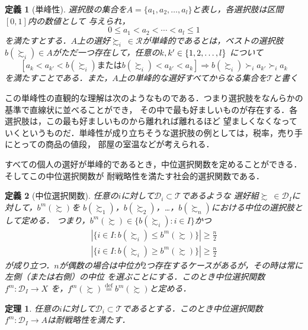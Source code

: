 \documentclass[dvipdfmx]{jsarticle}
\newtheorem*{THeorem}{定理}
\newtheorem*{DEfinition}{定義}
\begin{document}
\begin{DEfinition}[単峰性]
  選択肢の集合を$A = \{a_1, a_2, \ldots, a_{l}\}$と表し，各選択肢は区間$[0,1]$内の数値として
  与えられ，
  \[
    0 \leq a_1 < a_2 < \cdots < a_{l} \leq 1
  \]
  を満たすとする．$A$上の選好$\succsim_i \ \in \mathcal{R}$が単峰的であるとは，ベストの選択肢
  $b(\succsim_i) \in A$がただ一つ存在して，任意の$k, k' \in \{ 1, 2, \ldots, \mathnormal{l} \}$
  について
  \[
    [a_k < a_{k'} < b(\succsim_i) \text{または} b(\succsim_i) < a_{k'} < a_k]
    \Rightarrow b(\succsim_i) \succ_i a_{k'} \succ_i a_{k}
  \]
  を満たすことである．また，$A$上の単峰的な選好すべてからなる集合を$\mathcal{T}$と書く
\end{DEfinition}

この単峰性の直観的な理解は次のようなものである．つまり選択肢をなんらかの基準で直線状に並べることができ，
その中で最も好ましいものが存在する．各選択肢は，この最も好ましいものから離れれば離れるほど
望ましくなくなっていくというものだ．単峰性が成り立ちそうな選択肢の例としては，税率，売り手にとっての商品の値段，
部屋の室温などが考えられる．

すべての個人の選好が単峰的であるとき，中位選択関数を定めることができる．そしてこの中位選択関数が
耐戦略性を満たす社会的選択関数である．

\begin{DEfinition}[中位選択関数]
  任意の$i$に対して$\mathcal{D}_i \subset \mathcal{T}$であるような
  選好組$\succsim \ \in \mathcal{D}_I$に対して，$b^m(\succsim)$を
  $b(\succsim_1)$，$b(\succsim_2)$，\ldots，$b(\succsim_n)$における中位の選択肢として定める．
  つまり，$b^m(\succsim) \in \{ b(\succsim_i):i \in I \}$かつ
  \begin{eqnarray*}
    | \{i \in I: b(\succsim_i) \leq b^m(\succsim) \} | \geq \frac{n}{2} \\
    | \{i \in I: b(\succsim_i) \geq b^m(\succsim) \} | \geq \frac{n}{2}
  \end{eqnarray*}
  が成り立つ．$n$が偶数の場合は中位が$2$つ存在するケースがあるが，その時は常に左側（または右側）の中位
  を選ぶことにする．このとき中位選択関数$f^m\colon \mathcal{D}_{I} \to X$
  を，$f^m(\succsim) \stackrel{\mathrm{def}}{=} b^m(\succsim)$と定める．
\end{DEfinition}

\begin{THeorem}
  任意の$i$に対して$\mathcal{D}_i \subset \mathcal{T}$であるとする．このとき中位選択関数
  $f^m\colon \mathcal{D}_I \to A$は耐戦略性を満たす．
\end{THeorem}
\end{document}
